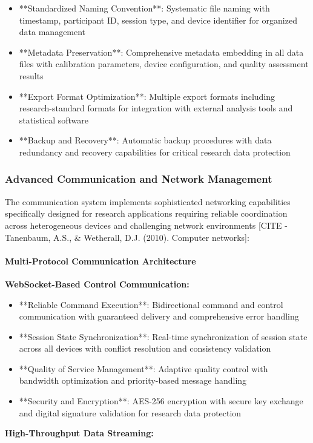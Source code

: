 \documentclass[12pt,a4paper]{report}
\begin{document}
\begin{itemize}
\item **Standardized Naming Convention**: Systematic file naming with timestamp, participant ID, session type, and device
  identifier for organized data management
\item **Metadata Preservation**: Comprehensive metadata embedding in all data files with calibration parameters, device
  configuration, and quality assessment results
\item **Export Format Optimization**: Multiple export formats including research-standard formats for integration with
  external analysis tools and statistical software
\item **Backup and Recovery**: Automatic backup procedures with data redundancy and recovery capabilities for critical
  research data protection

\end{itemize}
\subsubsection{Advanced Communication and Network Management}

The communication system implements sophisticated networking capabilities specifically designed for research
applications requiring reliable coordination across heterogeneous devices and challenging network
environments [CITE - Tanenbaum, A.S., \& Wetherall, D.J. (2010). Computer networks]:

\paragraph{Multi-Protocol Communication Architecture}

\textbf{WebSocket-Based Control Communication:}

\begin{itemize}
\item **Reliable Command Execution**: Bidirectional command and control communication with guaranteed delivery and
  comprehensive error handling
\item **Session State Synchronization**: Real-time synchronization of session state across all devices with conflict
  resolution and consistency validation
\item **Quality of Service Management**: Adaptive quality control with bandwidth optimization and priority-based message
  handling
\item **Security and Encryption**: AES-256 encryption with secure key exchange and digital signature validation for research
  data protection

\end{itemize}
\textbf{High-Throughput Data Streaming:}
\end{document}
